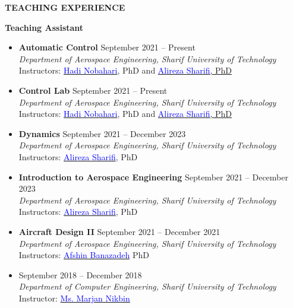 \documentclass[12pt]{article}
\begin{document}
\vspace{0.2in} %


\newpage

\begin{center}
	{\noindent \bfseries TEACHING EXPERIENCE}
\end{center}
{\bfseries Teaching Assistant}
\begin{itemize}
	\item {\bfseries Automatic Control}
	 \hfill September 2021 -- Present \\
	\textit{Department of Aerospace Engineering, Sharif University of Technology}\\
	Instructors: \href{https://ae.sharif.edu/~portal/faculty/1091235256}{\textcolor{blue}{Hadi Nobahari}}, PhD and \href{https://ae.sharif.edu/~portal/faculty/1730782165}{\textcolor{blue}{Alireza Sharifi}, PhD}
	\item {\bfseries Control Lab}
	 \hfill September 2021 -- Present \\
	\textit{Department of Aerospace Engineering, Sharif University of Technology}\\
	Instructors: \href{https://ae.sharif.edu/~portal/faculty/1091235256}{\textcolor{blue}{Hadi Nobahari}}, PhD and \href{https://ae.sharif.edu/~portal/faculty/1730782165}{\textcolor{blue}{Alireza Sharifi}, PhD}
	\item {\bfseries Dynamics}
	 \hfill September 2021 -- December 2023 \\
	\textit{Department of Aerospace Engineering, Sharif University of Technology}\\
	Instructors: \href{https://ae.sharif.edu/~portal/faculty/1730782165}{\textcolor{blue}{Alireza Sharifi}}, PhD
	\item {\bfseries Introduction to Aerospace Engineering}
	 \hfill September 2021 -- December 2023 \\
	\textit{Department of Aerospace Engineering, Sharif University of Technology}\\
	Instructors: \href{https://ae.sharif.edu/~portal/faculty/1730782165}{\textcolor{blue}{Alireza Sharifi}}, PhD
	\item {\bfseries Aircraft Design II}
	\hfill September 2021 -- December 2021 \\
   \textit{Department of Aerospace Engineering, Sharif University of Technology}\\
   Instructors: \href{http://ae.sharif.edu/~portal/faculty/1014037799}{\textcolor{blue}{Afshin Banazadeh}} PhD
	\item {}
	\hfill September 2018 -- December 2018 \\
   \textit{Department of Computer Engineering, Sharif University of Technology}\\
   \noindent Instructor: \href{https://www.linkedin.com/in/marjan-nikbin-a27451111}{\textcolor{blue}{Ms. Marjan Nikbin}}


\end{itemize}
\end{document}
